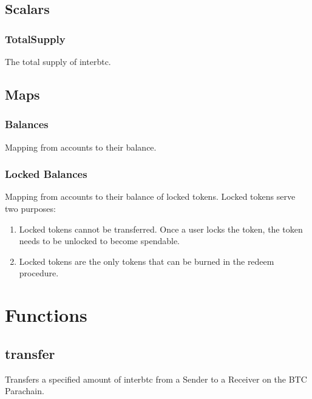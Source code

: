 \documentclass[a4paper,10pt,english]{sphinxmanual}
\begin{document}
\subsection{Scalars}
\label{\detokenize{spec/treasury:scalars}}

\subsubsection{TotalSupply}
\label{\detokenize{spec/treasury:totalsupply}}
The total supply of interbtc.


\subsection{Maps}
\label{\detokenize{spec/treasury:maps}}

\subsubsection{Balances}
\label{\detokenize{spec/treasury:balances}}
Mapping from accounts to their balance.


\subsubsection{Locked Balances}
\label{\detokenize{spec/treasury:locked-balances}}
Mapping from accounts to their balance of locked tokens. Locked tokens serve two purposes:
\begin{enumerate}
%
\item {} 
Locked tokens cannot be transferred. Once a user locks the token, the token needs to be unlocked to become spendable.

\item {} 
Locked tokens are the only tokens that can be burned in the redeem procedure.

\end{enumerate}


\section{Functions}
\label{\detokenize{spec/treasury:functions}}

\subsection{transfer}
\label{\detokenize{spec/treasury:transfer}}\label{\detokenize{spec/treasury:id1}}
Transfers a specified amount of interbtc from a Sender to a Receiver on the BTC Parachain.
\end{document}
